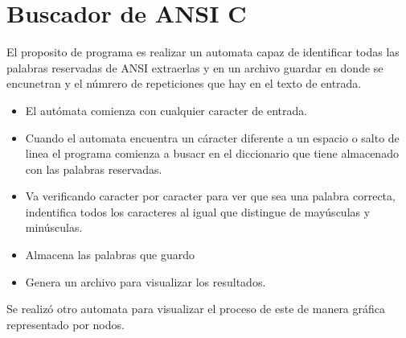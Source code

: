 \documentclass[a4paper]{article}
\begin{document}
        \section{Buscador de ANSI C}
            El proposito de programa es realizar un automata capaz de identificar todas las palabras reservadas de ANSI extraerlas y en un archivo guardar en donde se encunetran y el númrero de repeticiones que hay en el texto de entrada.
            \begin{itemize}
                \item El autómata comienza con cualquier caracter de entrada.
                \item Cuando el automata encuentra un cáracter diferente a un espacio o salto de linea el programa comienza a busacr en el diccionario que tiene almacenado con las palabras reservadas.
                \item Va verificando caracter por caracter para ver que sea una palabra correcta, indentifica todos los caracteres al igual que distingue de mayúsculas y minúsculas.
                \item Almacena las palabras que guardo
                \item Genera un archivo para visualizar los resultados.
            \end{itemize}
            Se realizó otro automata para visualizar el proceso de este de manera gráfica representado por nodos.
\end{document}
